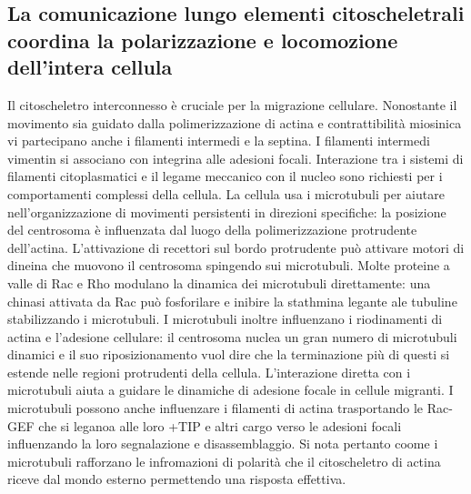 \subsection{La comunicazione lungo elementi citoscheletrali coordina la polarizzazione e locomozione dell'intera cellula}
Il citoscheletro interconnesso \`e cruciale per la migrazione cellulare. Nonostante il movimento sia guidato dalla polimerizzazione di actina e contrattibilit\`a miosinica vi partecipano
anche i filamenti intermedi e la septina. I filamenti intermedi vimentin si associano con integrina alle adesioni focali. Interazione tra i sistemi di filamenti citoplasmatici e il 
legame meccanico con il nucleo sono richiesti per i comportamenti complessi della cellula. La cellula usa i microtubuli per aiutare nell'organizzazione di movimenti persistenti in 
direzioni specifiche: la posizione del centrosoma \`e influenzata dal luogo della polimerizzazione protrudente dell'actina. L'attivazione di recettori sul bordo protrudente pu\`o 
attivare motori di dineina che muovono il centrosoma spingendo sui microtubuli. Molte proteine a valle di Rac e Rho modulano la dinamica dei microtubuli direttamente: una chinasi 
attivata da Rac pu\`o fosforilare e inibire la stathmina legante ale tubuline stabilizzando i microtubuli. I microtubuli inoltre influenzano i riodinamenti di actina e l'adesione
cellulare: il centrosoma nuclea un gran numero di microtubuli dinamici e il suo riposizionamento vuol dire che la terminazione pi\`u di questi si estende nelle regioni protrudenti
della cellula. L'interazione diretta con i microtubuli aiuta a guidare le dinamiche di adesione focale in cellule migranti. I microtubuli possono anche influenzare i filamenti di 
actina trasportando le Rac-GEF che si leganoa alle loro +TIP e altri cargo verso le adesioni focali influenzando la loro segnalazione e disassemblaggio. Si nota pertanto coome
i microtubuli rafforzano le infromazioni di polarit\`a che il citoscheletro di actina riceve dal mondo esterno permettendo una risposta effettiva. 
